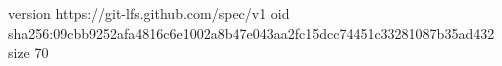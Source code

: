 version https://git-lfs.github.com/spec/v1
oid sha256:09cbb9252afa4816c6e1002a8b47e043aa2fc15dcc74451c33281087b35ad432
size 70
